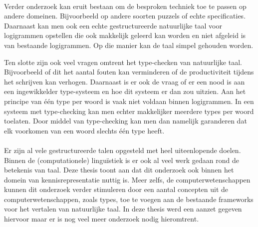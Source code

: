 \paragraph{} Verder onderzoek kan eruit bestaan om de besproken techniek toe te passen op andere domeinen. Bijvoorbeeld op andere soorten puzzels of echte specificaties. Daarnaast kan men ook een echte gestructureerde natuurlijke taal voor logigrammen opstellen die ook makkelijk geleerd kan worden en niet afgeleid is van bestaande logigrammen. Op die manier kan de taal simpel gehouden worden.

Ten slotte zijn ook veel vragen omtrent het type-checken van natuurlijke taal. Bijvoorbeeld of dit het aantal fouten kan verminderen of de productiviteit tijdens het schrijven kan verhogen. Daarnaast is er ook de vraag of er een nood is aan een ingewikkelder type-systeem en hoe dit systeem er dan zou uitzien. Aan het principe van één type per woord is vaak niet voldaan binnen logigrammen. In een systeem met type-checking kan men echter makkelijker meerdere types per woord toelaten. Door middel van type-checking kan men dan namelijk garanderen dat elk voorkomen van een woord slechts één type heeft.

\paragraph{} Er zijn al vele gestructureerde talen opgesteld met heel uiteenlopende doelen. Binnen de (computationele) linguïstiek is er ook al veel werk gedaan rond de betekenis van taal. Deze thesis toont aan dat dit onderzoek ook binnen het domein van kennisrepresentatie nuttig is. Meer zelfs, de computerwetenschappen kunnen dit onderzoek verder stimuleren door een aantal concepten uit de computerwetenschappen, zoals types, toe te voegen aan de bestaande frameworks voor het vertalen van natuurlijke taal. In deze thesis werd een aanzet gegeven hiervoor maar er is nog veel meer onderzoek nodig hieromtrent.
